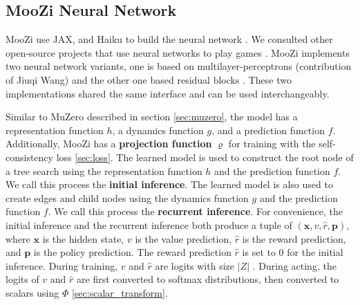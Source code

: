 \subsection{MooZi Neural Network} \label{sec:nn}
MooZi use JAX, and Haiku to build the neural network \cite{HaikuSonnetJAX_Hennigan.Cai.ea_2020,CompilingMachineLearning_Frostig.Johnson.ea_2019,JAXComposableTransformations_JamesBradbury.RoyFrostig.ea_2018}.
We consulted other open-source projects that use neural networks to play games \cite{MuZeroGeneral_Duvaud.AureleHainaut_2022, MasteringAtariGames_Ye.Liu.ea_2021, AcceleratingSelfPlayLearning_Wu_2020}.
MooZi implements two neural network variants, one is based on multilayer-perceptrons (contribution of Jiuqi Wang) and the other one based residual blocks \cite{DeepResidualLearning_He.Zhang.ea_2016}.
These two implementations shared the same interface and can be used interchangeably.

Similar to MuZero described in section \ref{sec:muzero}, the model has a representation function $h$, a dynamics function $g$, and a prediction function $f$.
Additionally, MooZi has a \textbf{projection function} $\varrho$ for training with the self-consistency loss \ref{sec:loss}.
The learned model is used to construct the root node of a tree search using the representation function $h$ and the prediction function $f$.
We call this process the \textbf{initial inference}.
The learned model is also used to create edges and child nodes using the dynamics function $g$ and the prediction function $f$.
We call this process the \textbf{recurrent inference}.
For convenience, the initial inference and the recurrent inference both produce a tuple of $(\mathbf{x}, v, \hat{r}, \mathbf{p})$, where $\mathbf{x}$ is the hidden state, $v$ is the value prediction, $\hat{r}$ is the reward prediction, and $\mathbf{p}$ is the policy prediction.
The reward prediction $\hat{r}$ is set to 0 for the initial inference.
During training, $v$ and $\hat{r}$ are logits with size $|Z|$ .
During acting, the logits of $v$ and $\hat{r}$ are first converted to softmax distributions, then converted to scalars using $\Phi$ \ref{sec:scalar_transform}.


